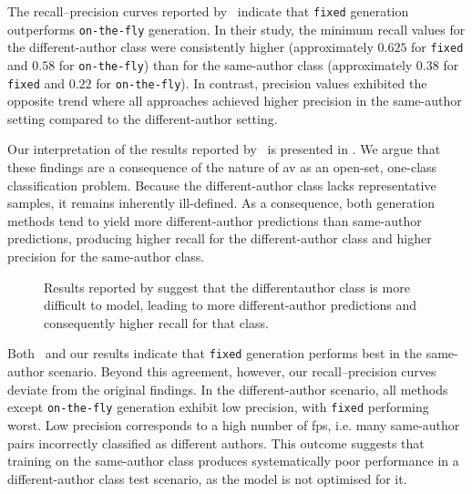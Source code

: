 The recall–precision curves reported by \citet{koppel_determining_2014}\ indicate that \texttt{fixed} \imp{} generation outperforms \texttt{on-the-fly} \imp{} generation.
In their study, the minimum recall values for the different-author class were consistently higher (approximately $0.625$ for \texttt{fixed} and $0.58$ for \texttt{on-the-fly}) than for the same-author class (approximately $0.38$ for \texttt{fixed} and $0.22$ for \texttt{on-the-fly}).
In contrast, precision values exhibited the opposite trend where all approaches achieved higher precision in the same-author setting compared to the different-author setting.

Our interpretation of the results reported by \citet{koppel_determining_2014}\ is presented in .
We argue that these findings are a consequence of the nature of \ac{av} as an open-set, one-class classification problem.
Because the different-author class lacks representative samples, it remains inherently ill-defined.
As a consequence, both \imp{} generation methods tend to yield more different-author predictions than same-author predictions, producing higher recall for the different-author class and higher precision for the same-author class.

\begin{figure}[htbp]
    \centering
    
    \caption[Aggregating original \impAppr{} experiment results.]{Results reported by \citet{koppel_determining_2014} suggest that the different\-author class is more difficult to model, leading to more different-author predictions and consequently higher recall for that class.}
    \label{fig:findings_original_work}
\end{figure}

Both \citet{koppel_determining_2014}\ and our results indicate that \texttt{fixed} \imp{} generation performs best in the same-author scenario.
Beyond this agreement, however, our recall–precision curves deviate from the original findings.
In the different-author scenario, all methods except \texttt{on-the-fly} generation exhibit low precision, with \texttt{fixed} \imps{} performing worst.
Low precision corresponds to a high number of \acp{fp}, i.e. many same-author pairs incorrectly classified as different authors.
This outcome suggests that training on the same-author class produces systematically poor performance in a different-author class test scenario, as the model is not optimised for it.

